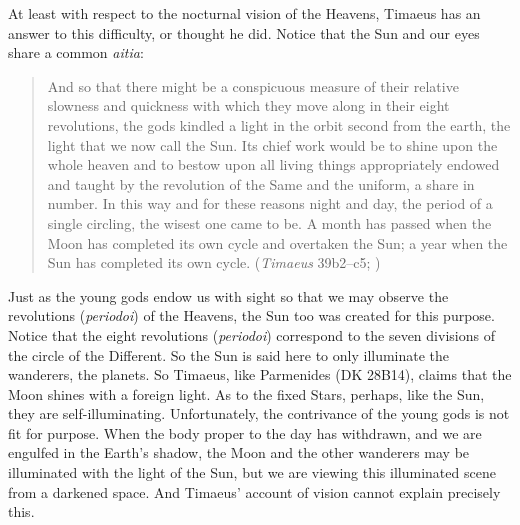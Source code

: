 At least with respect to the nocturnal vision of the Heavens, Timaeus has an answer to this difficulty, or thought he did. Notice that the Sun and our eyes share a common \emph{aitia}:
\begin{quote}
	And so that there might be a conspicuous measure of their relative slowness and quickness with which they move along in their eight revolutions, the gods kindled a light in the orbit second from the earth, the light that we now call the Sun. Its chief work would be to shine upon the whole heaven and to bestow upon all living things appropriately endowed and taught by the revolution of the Same and the uniform, a share in number. In this way and for these reasons night and day, the period of a single circling, the wisest one came to be. A month has passed when the Moon has completed its own cycle and overtaken the Sun; a year when the Sun has completed its own cycle. (\emph{Timaeus} 39b2--c5; \citealt[25--6]{Zeyl:2000cs})
\end{quote}
Just as the young gods endow us with sight so that we may observe the revolutions (\emph{periodoi}) of the Heavens, the Sun too was created for this purpose. Notice that the eight revolutions (\emph{periodoi}) correspond to the seven divisions of the circle of the Different. So the Sun is said here to only illuminate the wanderers, the planets. So Timaeus, like Parmenides (DK 28B14), claims that the Moon shines with a foreign light. As to the fixed Stars, perhaps, like the Sun, they are self-illuminating. Unfortunately, the contrivance of the young gods is not fit for purpose. When the body proper to the day has withdrawn, and we are engulfed in the Earth's shadow, the Moon and the other wanderers may be illuminated with the light of the Sun, but we are viewing this illuminated scene from a darkened space. And Timaeus' account of vision cannot explain precisely this.

